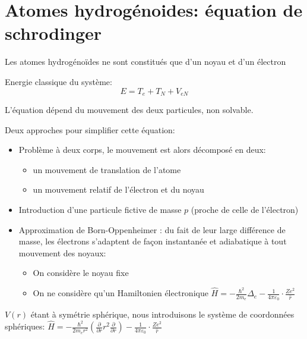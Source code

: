 \documentclass[../main.tex]{subfile}
\begin{document}
\part{Atomes hydrogénoides: équation de schrodinger}

\begin{defi}
	Les atomes hydrogénoïdes ne sont constitués que d'un noyau et d'un électron
\end{defi}

Energie classique du système:
$$E = T_e + T_N + V_{eN}$$


L'équation dépend du mouvement des deux particules, non solvable.

Deux approches pour simplifier cette équation:
\begin{itemize}
	\item Problème à deux corps, le mouvement est alors décomposé en deux:
\begin{itemize}	
	\item un mouvement de translation de l'atome
	\item un mouvement relatif de l'électron et du noyau
\end{itemize}
	\item Introduction d'une particule fictive de masse $p$ (proche de celle de l'électron)
	\item Approximation de Born-Oppenheimer : du fait de leur large différence de masse, les électrons s'adaptent de façon instantanée et adiabatique à tout mouvement des noyaux:
\begin{itemize}	
	\item On considère le noyau fixe
	\item On ne considère qu'un Hamiltonien électronique
	$\hat{H} = -\frac{\hbar^2}{2m_e} \Delta_e - \frac{1}{4\pi\varepsilon_0}\cdot \frac{Ze^2}{\hat{r}}$
\end{itemize}
\end{itemize}

$V(r)$ étant à symétrie sphérique, nous introduisons le système de coordonnées sphériques:
	$\hat{H} = -\frac{\hbar^2}{2m_er^2} (\frac{\partial}{\partial r} r^2 \frac{\partial}{\partial r}) - \frac{1}{4\pi\varepsilon_0}\cdot \frac{Ze^2}{\hat{r}}$
\end{document}
